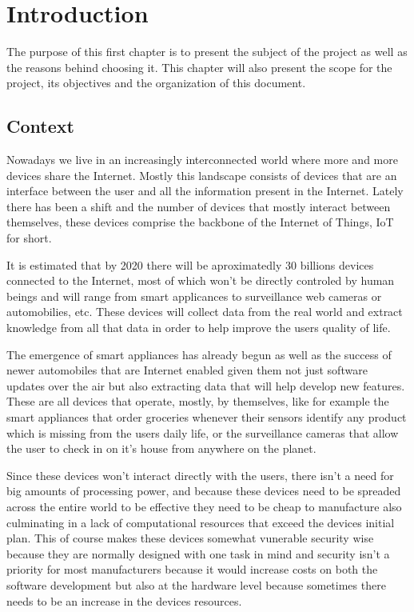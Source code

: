 \chapter{Introduction}
\label{chap:intro}

The purpose of this first chapter is to present the subject of the project as
well as the reasons behind choosing it. This chapter will also present the scope
for the project, its objectives and the organization of this document.

\section{Context}
\label{sec:context} %
Nowadays we live in an increasingly interconnected world where more and more
devices share the Internet. Mostly this landscape consists of devices that are
an interface between the user and all the information present in the Internet.
Lately there has been a shift and the number of devices that mostly interact
between themselves, these devices comprise the backbone of the Internet of
Things, IoT for short.

It is estimated that by 2020 there will be aproximatedly 30 billions devices
connected to the Internet, most of which won't be directly controled by human
beings and will range from smart applicances to surveillance web cameras or
automobilies, etc.
These devices will collect data from the real world and extract knowledge
from all that data in order to help improve the users quality of life.

The emergence of smart appliances has already begun as well as the success of
newer automobiles that are Internet enabled given them not just software updates
over the air but also extracting data that will help develop new features. These
are all devices that operate, mostly, by themselves, like for example the smart
appliances that order groceries whenever their sensors identify any product
which is missing from the users daily life, or the surveillance cameras that
allow the user to check in on it's house from anywhere on the planet.

Since these devices won't interact directly with the users, there isn't a need
for big amounts of processing power, and because these devices need to be
spreaded across the entire world to be effective they need to be  cheap to
manufacture also culminating in a lack of computational resources that exceed
the devices initial plan.
This of course makes these devices somewhat vunerable security wise because they
are normally designed with one task in mind and security isn't a priority for
most manufacturers because it would increase costs on both the software
development but also at the hardware level because sometimes there needs to be
an increase in the devices resources.

